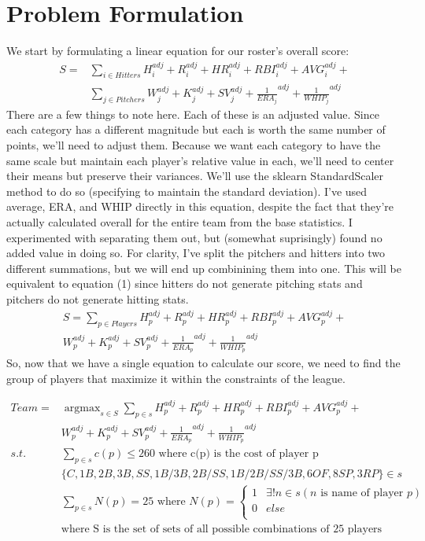 \documentclass{article}
\DeclareMathOperator*{\argmax}{argmax}
\begin{document}
\section*{Problem Formulation}
We start by formulating a linear equation for our roster's overall score:
\begin{align}
S = &\sum\limits_{i \in Hitters} {H_i^{adj} + R_i^{adj} + HR_i^{adj} + RBI_i^{adj} + AVG_i^{adj}} + \nonumber \\ &\sum\limits_{j \in Pitchers} {W_j^{adj} + K_j^{adj} + SV_j^{adj} + {\frac{1}{ERA_j}}^{adj} + {\frac{1}{WHIP_j}}^{adj}}
\end{align} 
There are a few things to note here. Each of these is an adjusted value. Since each category has a different magnitude but each is worth the same number of points, we'll need to adjust them. Because we want each category to have the same scale but maintain each player's relative value in each, we'll need to center their means but preserve their variances. We'll use the sklearn StandardScaler method to do so (specifying to maintain the standard deviation). I've used average, ERA, and WHIP directly in this equation, despite the fact that they're actually calculated overall for the entire team from the base statistics. I experimented with separating them out, but (somewhat suprisingly) found no added value in doing so. For clarity, I've split the pitchers and hitters into two different summations, but we will end up combinining them into one. This will be equivalent to equation (1) since hitters do not generate pitching stats and pitchers do not generate hitting stats. 
\begin{align}
S = \sum\limits_{p \in Players} {H_p^{adj} + R_p^{adj} + HR_p^{adj} + RBI_p^{adj} + AVG_p^{adj}} + \\ \nonumber {W_p^{adj} + K_p^{adj} + SV_p^{adj} + {\frac{1}{ERA_p}}^{adj} + {\frac{1}{WHIP_p}}^{adj}}
\end{align} 
So, now that we have a single equation to calculate our score, we need to find the group of players that maximize it within the constraints of the league.

\begin{align}
Team = &\argmax_{s \in S} \sum\limits_{p \in s} {H_p^{adj} + R_p^{adj} + HR_p^{adj} + RBI_p^{adj} + AVG_p^{adj}} + \\ \nonumber &{W_p^{adj} + K_p^{adj} + SV_p^{adj} + {\frac{1}{ERA_p}}^{adj} + {\frac{1}{WHIP_p}}^{adj}} \\
\nonumber s.t. &\sum\limits_{p \in s} c(p) \leq 260 \mbox{ where c(p) is the cost of player p}\\
\nonumber &\{C,1B,2B,3B,SS,1B/3B,2B/SS,1B/2B/SS/3B,6 OF, 8 SP, 3 RP\} \in s \\ 
\nonumber &\sum\limits_{p \in s} N(p) = 25 \mbox{ where } N(p) = \begin{cases} 
															1 & \exists!n \in s(n\mbox{ is name of player }p) \\
															0 & else \\
                                                         \end{cases}\\
\nonumber &\mbox{where S is the set of sets of all possible combinations of 25 players}
\end{align}
\pagebreak
\end{document}
